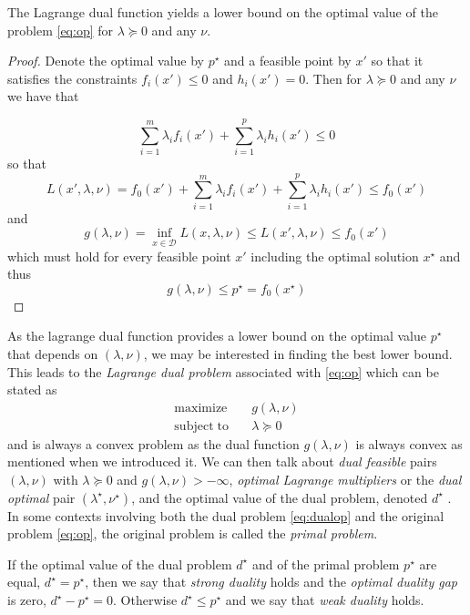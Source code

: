 \begin{theorem}
  The Lagrange dual function yields a lower bound on the optimal value of the problem \eqref{eq:op} for $\lambda \succeq 0$ and any $\nu$.
\end{theorem}
\begin{proof}
  Denote the optimal value by $p^\star$ and a feasible point by $x'$ so that it satisfies the constraints $f_i(x') \le 0$ and $h_i(x') = 0$. Then for $\lambda \succeq 0$ and any $\nu$ we have that
  
  $$ \sum_{i=1}^m \lambda_i f_i(x') + \sum_{i=1}^p \lambda_i h_i(x') \le 0 $$
  so that
  $$ L(x',\lambda,\nu) = f_0(x') + \sum_{i=1}^m \lambda_i f_i(x') + \sum_{i=1}^p \lambda_i h_i(x') \le f_0(x') $$
  and
  $$ g(\lambda, \nu) = \inf_{x \in \mathcal{D}} L(x, \lambda, \nu) \le L(x', \lambda, \nu) \le f_0(x') $$
  which must hold for every feasible point $x'$ including the optimal solution $x^\star$ and thus
  $$ g(\lambda, \nu) \le p^\star = f_0(x^\star) $$ 
\end{proof}


As the lagrange dual function provides a lower bound on the optimal value $p^\star$ that depends on $(\lambda,\nu)$, we may be interested in finding the best lower bound. This leads to the \emph{Lagrange dual problem} associated with \eqref{eq:op} which can be stated as
\begin{align} \label{eq:dualop}
\mathrm{maximize}    \quad & g(\lambda, \nu) \nonumber \\
\mathrm{subject\;to} \quad & \lambda \succeq 0
\end{align}
and is always a convex problem as the dual function $g(\lambda, \nu)$ is always convex as mentioned when we introduced it. We can then talk about \emph{dual feasible} pairs $(\lambda,\nu)$ with $\lambda \succeq 0$ and $g(\lambda,\nu) > -\infty$, \emph{optimal Lagrange multipliers} or the \emph{dual optimal} pair $(\lambda^\star, \nu^\star)$, and the optimal value of the dual problem, denoted $d^\star$ . In some contexts involving both the dual problem \eqref{eq:dualop} and the original problem \eqref{eq:op}, the original problem is called the \emph{primal problem}.

If the optimal value of the dual problem $d^\star$ and of the primal problem $p^\star$ are equal, $d^\star = p^\star$, then we say that \emph{strong duality} holds and the \emph{optimal duality gap} is zero, $d^\star - p^\star = 0$. Otherwise $d^\star \le p^\star$ and we say that \emph{weak duality} holds.

